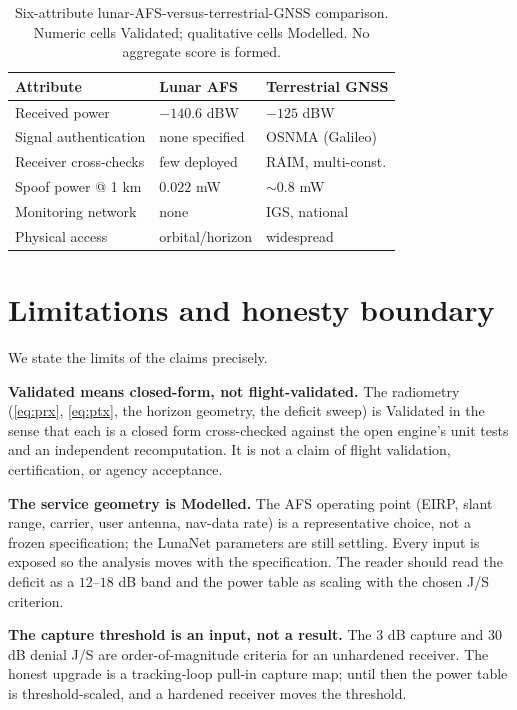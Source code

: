 \documentclass[conference]{IEEEtran}
\begin{document}
\begin{table}[t]
\centering
\caption{Six-attribute lunar-AFS-versus-terrestrial-GNSS comparison. Numeric cells
Validated; qualitative cells Modelled. No aggregate score is formed.}
\label{tab:compare}
\begin{tabular}{lll}
\toprule
Attribute & Lunar AFS & Terrestrial GNSS \\
\midrule
Received power   & $-140.6$ dBW      & $-125$ dBW \\
Signal authentication & none specified & OSNMA (Galileo) \\
Receiver cross-checks & few deployed  & RAIM, multi-const. \\
Spoof power @ 1 km & $0.022$ mW       & $\sim$$0.8$ mW \\
Monitoring network & none             & IGS, national \\
Physical access    & orbital/horizon  & widespread \\
\bottomrule
\end{tabular}
\end{table}

\section{Limitations and honesty boundary}
\label{sec:honesty}
We state the limits of the claims precisely.

\textbf{Validated means closed-form, not flight-validated.} The radiometry
(\eqref{eq:prx}, \eqref{eq:ptx}, the horizon geometry, the deficit sweep) is
Validated in the sense that each is a closed form cross-checked against the open
engine's unit tests and an independent recomputation. It is not a claim of flight
validation, certification, or agency acceptance.

\textbf{The service geometry is Modelled.} The AFS operating point (EIRP, slant
range, carrier, user antenna, nav-data rate) is a representative choice, not a frozen
specification; the LunaNet parameters are still settling. Every input is exposed so
the analysis moves with the specification. The reader should read the deficit as a
$12$--$18$ dB band and the power table as scaling with the chosen J/S criterion.

\textbf{The capture threshold is an input, not a result.} The $3$ dB capture and
$30$ dB denial J/S are order-of-magnitude criteria for an unhardened receiver. The
honest upgrade is a tracking-loop pull-in capture map; until then the power table is
threshold-scaled, and a hardened receiver moves the threshold.
\end{document}
